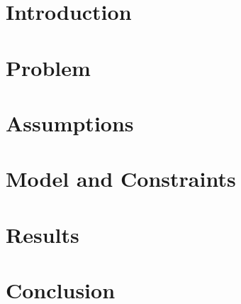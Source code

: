 \documentclass{article}
\begin{document}

\section{Introduction}



\section{Problem}



\section{Assumptions}



\section{Model and Constraints}



\section{Results}



\section{Conclusion}
\end{document}
